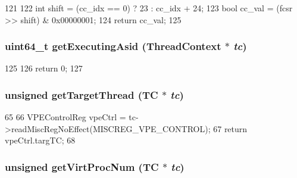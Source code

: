 \begin{DoxyCode}
121 {
122     int shift = (cc_idx == 0) ? 23 : cc_idx + 24;
123     bool cc_val = (fcsr >> shift) & 0x00000001;
124     return cc_val;
125 }
\end{DoxyCode}
\hypertarget{namespaceMipsISA_ada6b2a9f08bac266b15f41ee721aca4b}{
\subsubsection[{getExecutingAsid}]{\setlength{\rightskip}{0pt plus 5cm}uint64\_\-t getExecutingAsid ({\bf ThreadContext} $\ast$ {\em tc})}}
\label{namespaceMipsISA_ada6b2a9f08bac266b15f41ee721aca4b}



\begin{DoxyCode}
125 {
126     return 0;
127 }
\end{DoxyCode}
\hypertarget{namespaceMipsISA_ab8a7664b76486386dbdb999b696f28a7}{
\subsubsection[{getTargetThread}]{\setlength{\rightskip}{0pt plus 5cm}unsigned getTargetThread (TC $\ast$ {\em tc})}}
\label{namespaceMipsISA_ab8a7664b76486386dbdb999b696f28a7}



\begin{DoxyCode}
65 {
66     VPEControlReg vpeCtrl = tc->readMiscRegNoEffect(MISCREG_VPE_CONTROL);
67     return vpeCtrl.targTC;
68 }
\end{DoxyCode}
\hypertarget{namespaceMipsISA_ace8d9fa5b5b0e0df218ba5a8b8f4f257}{
\subsubsection[{getVirtProcNum}]{\setlength{\rightskip}{0pt plus 5cm}unsigned getVirtProcNum (TC $\ast$ {\em tc})}}
\label{namespaceMipsISA_ace8d9fa5b5b0e0df218ba5a8b8f4f257}



